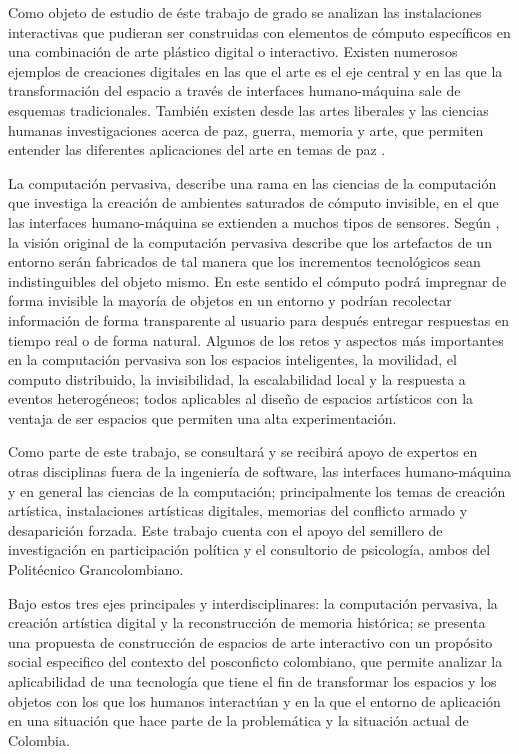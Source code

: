 Como objeto de estudio de éste trabajo de grado se analizan las instalaciones interactivas que pudieran ser construidas con elementos de cómputo específicos en una combinación de arte plástico digital o interactivo. Existen numerosos ejemplos
\cite{RN35,RN25,RN34,RN38,RN31,RN29,RN40,RN37}
de creaciones digitales en las que el arte es el eje central y en las que la transformación del espacio a través de interfaces humano-máquina sale de esquemas tradicionales. También existen desde las artes liberales y las ciencias humanas investigaciones acerca de paz, guerra, memoria y arte, que permiten entender las diferentes aplicaciones del arte en temas de paz \cite{Jimenez201672,SotoAguilar201591,EstripeautBourjac2013154}. 

La computación pervasiva, describe una rama en las ciencias de la computación que investiga la creación de ambientes saturados de cómputo invisible, en el que las interfaces humano-máquina se extienden a muchos tipos de sensores. Según \cite{RN1}, la visión original de la computación pervasiva describe que los artefactos de un entorno serán fabricados de tal manera que los incrementos tecnológicos sean indistinguibles del objeto mismo. En este sentido el cómputo podrá impregnar de forma invisible la mayoría de objetos en un entorno y podrían recolectar información de forma transparente al usuario para después entregar respuestas en tiempo real o de forma natural.  Algunos de los retos y aspectos más importantes en la computación pervasiva son los espacios inteligentes, la movilidad, el computo distribuido, la invisibilidad, la escalabilidad local y la respuesta a eventos heterogéneos; todos aplicables al diseño de espacios artísticos con la ventaja de ser espacios que permiten una alta experimentación.

Como parte de este trabajo, se consultará y se recibirá apoyo de expertos en otras disciplinas fuera de la ingeniería de software, las interfaces humano-máquina y en general las ciencias de la computación; principalmente los temas de creación artística, instalaciones artísticas digitales, memorias del conflicto armado y desaparición forzada. Este trabajo cuenta con el apoyo del semillero de investigación en participación política y el consultorio de psicología, ambos del Politécnico Grancolombiano.

Bajo estos tres ejes principales y interdisciplinares: la computación pervasiva, la creación artística digital y la reconstrucción de memoria histórica; se presenta una propuesta de construcción de espacios de arte interactivo con un propósito social especifico del contexto del posconficto colombiano, que permite analizar la aplicabilidad de una tecnología que tiene el fin de transformar los espacios y los objetos con los que los humanos interactúan y en la que el entorno de aplicación en una situación que hace parte de la problemática y la situación actual de Colombia.


